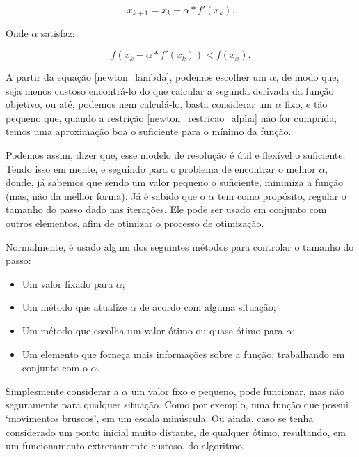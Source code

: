 \begin{equation}
    x_{k+1} = x_{k} -  \alpha * f'(x_{k}).
    \label{newton_lambda}
\end{equation}

Onde \(\alpha\) satisfaz:

\begin{equation}
    f(x_{k} -  \alpha * f'(x_{k})) < f(x_{x}).
    \label{newton_restricao_alpha}
\end{equation}

A partir da equação \ref{newton_lambda}, podemos escolher um \(\alpha\), de
modo que, seja menos custoso encontrá-lo do que calcular a segunda derivada
da função objetivo, ou até, podemos nem calculá-lo, basta considerar
um \(\alpha\) fixo, e tão pequeno que, quando a restrição
\ref{newton_restricao_alpha} não for cumprida, temos uma aproximação boa o
suficiente para o mínimo da função.

Podemos assim, dizer que, esse modelo de resolução é útil e flexível o
suficiente. Tendo isso em mente, e seguindo para o problema de encontrar
o melhor \(\alpha\), donde, já sabemos que sendo um valor pequeno o
suficiente, minimiza a função (mas, não da melhor forma). Já é sabido
que o \(\alpha\) tem como propósito, regular o tamanho do passo dado nas
iterações. Ele pode ser usado em conjunto com outros elementos, afim de
otimizar o processo de otimização.

Normalmente, é usado algum dos seguintes métodos para controlar o tamanho do
passo:

    \begin{itemize}
            \item Um valor fixado para \(\alpha\);
            \item Um método que atualize \(\alpha\) de acordo com alguma
                situação;
            \item Um método que escolha um valor ótimo ou quase ótimo para
                \(\alpha\);
            \item Um elemento que forneça mais informações sobre a função,
                trabalhando em conjunto com o \(\alpha\).
    \end{itemize}


Simplesmente considerar a \(\alpha\) um valor fixo e pequeno, pode funcionar,
mas não seguramente para qualquer situação. Como por exemplo, uma função que
possui `movimentos bruscos', em um escala minúscula. Ou ainda, caso se tenha
considerado um ponto inicial muito distante, de qualquer ótimo, resultando,
em um funcionamento extremamente custoso, do algoritmo.

